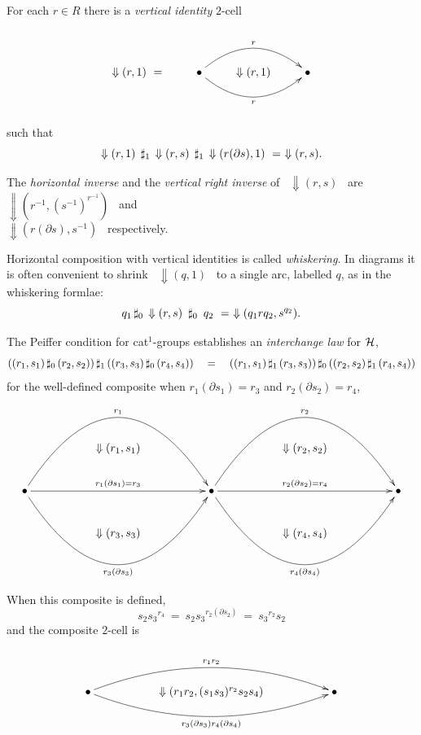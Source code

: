 \medskip\noindent
For each $r \in R$ there is a \emph{vertical identity} $2$-cell 
$$
\xy
\xymatrix{
   & & & \\
 \Downarrow(r,1)~=
   & \bullet  \ar@/^5ex/[rr]^{r} 
             \ar@/_5ex/[rr]_{r} 
     & \Downarrow (r,1)
        & \bullet \\
   & & & \\
}
\endxy
$$
such that
$$
\Downarrow(r,1)\; \,\sharp_1\, \Downarrow(r,s)\; 
                  \,\sharp_1\, \Downarrow(r(\partial s),1)
~=~ \Downarrow(r,s).
$$

The \emph{horizontal inverse} and the 
\emph{vertical right inverse} of ~$\Downarrow(r,s)$~ 
are ~$\Downarrow(r^{-1},(s^{-1})^{r^{-1}})$~ and \\  
$\Downarrow(r(\partial s),s^{-1})$~ respectively.

Horizontal composition with vertical identities is called 
\emph{whiskering}. 
In diagrams it is often convenient to shrink ~$\Downarrow(q,1)$~ 
to a single arc, labelled $q$, as in the whiskering formlae:
$$
q_1 \,\sharp_0\, \Downarrow(r,s) ~\,\sharp_0\,~ q_2 
~=~ \Downarrow(q_1rq_2,{s}^{q_2}).
$$

\bigskip\noindent
The Peiffer condition for cat$^1$-groups establishes an 
  
\emph{interchange law} for $\mathcal{H}$,
$$
((r_1,s_1) \,\sharp_0\, (r_2,s_2)) \,\sharp_1\, ((r_3,s_3) \,\sharp_0\, (r_4,s_4))
\quad = \quad
((r_1,s_1) \,\sharp_1\, (r_3,s_3)) \,\sharp_0\, ((r_2,s_2) \,\sharp_1\, (r_4,s_4)) 
$$
for the well-defined composite 
when $r_1(\partial s_1) = r_3$ and $r_2(\partial s_2) = r_4$,
$$
\xy
\xymatrix{
  && && && && \\
  && \Downarrow (r_1,s_1)
     && && \Downarrow (r_2,s_2)
           && \\
  \bullet \ar@/^15ex/[rrrr]^{r_1} 
          \ar[rrrr]^{r_1(\partial s_1) = r_3}
          \ar@/_15ex/[rrrr]_{r_3(\partial s_3)} 
  && && \bullet \ar@/^15ex/[rrrr]^{r_2} 
                \ar[rrrr]^{r_2(\partial s_2) = r_4}
                \ar@/_15ex/[rrrr]_{r_4(\partial s_4)} 
        && && \bullet \\
  && \Downarrow (r_3,s_3)
     && && \Downarrow (r_4,s_4)
           && \\
  && && && && \\
}
\endxy
$$

\noindent
When this composite is defined, 
$$
    s_2{s_3}^{r_4}
~=~ s_2{s_3}^{r_2(\partial s_2)}
~=~ {s_3}^{r_2}s_2
$$
and the composite $2$-cell is
$$
\xy
\xymatrix{
   && && \\
   \bullet \ar@/^5ex/[rrrr]^{r_1r_2} 
           \ar@/_5ex/[rrrr]_{r_3(\partial s_3)r_4(\partial s_4)} 
   && \Downarrow (r_1r_2,(s_1s_3)^{r_2}s_2s_4)
      && \bullet \\
   && && \\
}
\endxy
$$
